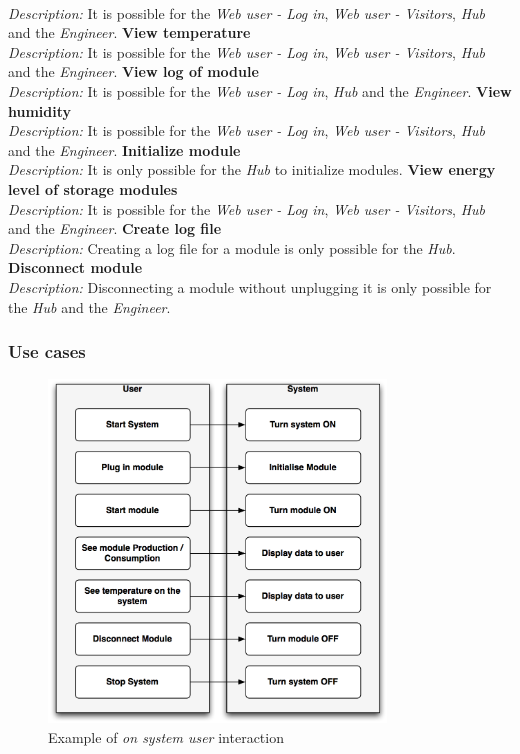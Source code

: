 \\\textit{Description: }It is possible for the \textit{Web user - Log in}, \textit{Web user - Visitors}, \textit{Hub} and the \textit{Engineer}.
\p\textbf{View temperature}
\\\textit{Description: }It is possible for the \textit{Web user - Log in}, \textit{Web user - Visitors}, \textit{Hub} and the \textit{Engineer}.
\p\textbf{View log of module}
\\\textit{Description: }It is possible for the \textit{Web user - Log in}, \textit{Hub} and the \textit{Engineer}.
\p\textbf{View humidity}
\\\textit{Description: }It is possible for the \textit{Web user - Log in}, \textit{Web user - Visitors}, \textit{Hub} and the \textit{Engineer}.
\p\textbf{Initialize module}
\\\textit{Description: }It is only possible for the \textit{Hub} to initialize modules.
\p\textbf{View energy level of storage modules}
\\\textit{Description: }	It is possible for the \textit{Web user - Log in}, \textit{Web user - Visitors}, \textit{Hub} and the \textit{Engineer}.
\p\textbf{Create log file}
\\\textit{Description: }Creating a log file for a module is only possible for the \textit{Hub}.
\p\textbf{Disconnect module}
\\\textit{Description: }Disconnecting a module without unplugging it is only possible for the \textit{Hub} and the \textit{Engineer}.
\subsubsection{Use cases}

\begin{figure}[H]
	\begin{centering}
		 \includegraphics[width=0.8\textwidth]{images/sys_int.png}
		\caption{Example of \textit{on system user} interaction}
	\end{centering}
\end{figure}

